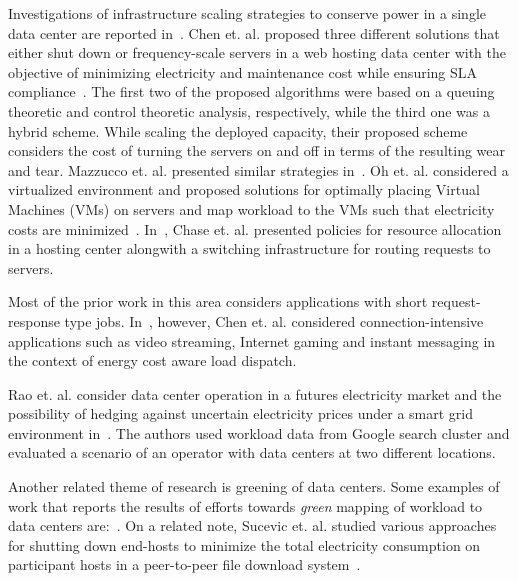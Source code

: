 Investigations of infrastructure scaling strategies to conserve power in a single data center are reported in~\cite{serverEnergy,Mazzucco:Maximizing:2011:CoRR,Oh:2011:ECS:2170444.2170458,Chase:2001:MES:502059.502045}. Chen et. al. proposed three different solutions that either shut down or frequency-scale servers in a web hosting data center with the objective of minimizing electricity and maintenance cost while ensuring SLA compliance~\cite{serverEnergy}. The first two of the proposed algorithms were based on a queuing theoretic and control theoretic analysis, respectively, while the third one was a hybrid scheme. While scaling the deployed capacity, their proposed scheme considers the cost of turning the servers on and off in terms of the resulting wear and tear. Mazzucco et. al. presented similar strategies in~\cite{Mazzucco:Maximizing:2011:CoRR}. Oh et. al. considered a virtualized environment and proposed solutions for optimally placing Virtual Machines (VMs) on servers and map workload to the VMs such that electricity costs are minimized~\cite{Oh:2011:ECS:2170444.2170458}. In~\cite{Chase:2001:MES:502059.502045}, Chase et. al. presented policies for resource allocation in a hosting center alongwith a switching infrastructure for routing requests to servers.

Most of the prior work in this area considers applications with short request-response type jobs. In~\cite{Chen:2008:ESP:1387589.1387613}, however, Chen et. al. considered connection-intensive applications such as video streaming, Internet gaming and instant messaging in the context of energy cost aware load dispatch. 

Rao et. al. consider data center operation in a futures electricity market and the possibility of hedging against uncertain electricity prices under a smart grid environment in~\cite{Rao:2011:TSG}. The authors used workload data from Google search cluster and evaluated a scenario of an operator with data centers at two different locations.

Another related theme of research is greening of data centers. Some examples of work that reports the results of efforts towards \textit{green} mapping of workload to data centers are:~\cite{Le:HotPower:2009,Zheng2011275,Koutitas:2010:JGE,abbasi2011dahm,chiaraviglio2010greencoop,Phan:2012:GECCO,Liu:2011:SIGMETRICS,Liu:2011:GREENMETRICS}. On a related note, Sucevic et. al. studied various approaches for shutting down end-hosts to minimize the total electricity consumption on participant hosts in a peer-to-peer file download system~\cite{Sucevic:2011:PDE:2160803.2160864}.

